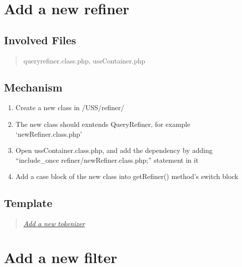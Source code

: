 \documentclass[letterpaper,10pt,english]{sphinxmanual}
\begin{document}
\section{Add a new refiner}
\label{docs/hooks/new_refiner:add-a-new-refiner}\label{docs/hooks/new_refiner::doc}\label{docs/hooks/new_refiner:hook-refiner}

\subsection{Involved Files}
\label{docs/hooks/new_refiner:involved-files}\begin{quote}

queryrefiner.class.php, ussContainer.php
\end{quote}


\subsection{Mechanism}
\label{docs/hooks/new_refiner:mechanism}\begin{enumerate}
\item {} 
Create a new class in /USS/refiner/

\item {} 
The new class should exntends QueryRefiner, for example `newRefiner.class.php'

\item {} 
Open ussContainer.class.php, and add the dependency by adding ``include\_once refiner/newRefiner.class.php;'' statement in it

\item {} 
Add a case block of the new class into getRefiner() method's switch block

\end{enumerate}


\subsection{Template}
\label{docs/hooks/new_refiner:template}\begin{quote}

{\hyperref[docs/hooks/t_tokenizer:hook-template-uss]{\emph{Add a new tokenizer}}}
\end{quote}


\section{Add a new filter}
\label{docs/hooks/new_filter:hook-filter}\label{docs/hooks/new_filter::doc}\label{docs/hooks/new_filter:add-a-new-filter}
\end{document}
